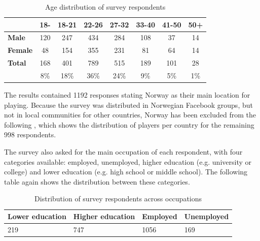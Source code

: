 \begin{table}[h]
	\centering
	\caption{Age distribution of survey respondents}
	\label{tbl:survey-age-distribution}
	\begin{tabular}{|l||c|c|c|c|c|c|c|}
		\hline
		&\textbf{18-} & \textbf{18-21} & \textbf{22-26} & \textbf{27-32} & \textbf{33-40} & \textbf{41-50} & \textbf{50+}\\
		\hline\hline
		\textbf{Male} & 120 & 247 & 434 & 284 & 108 & 37 & 14 \\
		\hline
		\textbf{Female} & 48 & 154 & 355 & 231 & 81 & 64 & 14 \\
		\hline
		\textbf{Total} & 168 & 401 & 789 & 515 & 189 & 101 & 28 \\
					& 8\% & 18\% & 36\% & 24\% & 9\% & 5\% & 1\%\\
		\hline
	\end{tabular}
\end{table}


The results contained 1192 responses stating Norway as their main location for playing. Because the survey was distributed in Norwegian Facebook groups, but not in local communities for other countries, Norway has been excluded from the following , which shows the distribution of players per country for the remaining 998 respondents.


The survey also asked for the main occupation of each respondent, with four categories available: employed, unemployed, higher education (e.g. university or college) and lower education (e.g. high school or middle school). The following table again shows the distribution between these categories. 

\begin{table}[h]
	\centering
	\caption{Distribution of survey respondents across occupations}
	\label{tbl:survey-occupation-distribution}
	\begin{tabularx}{\textwidth}{|l|l|X|X|}
		\hline
		\textbf{Lower education} & \textbf{Higher education} & \textbf{Employed} & \textbf{Unemployed}\\
		\hline\hline
		219 & 747 & 1056 & 169\\
		\hline
	\end{tabularx}
\end{table}

